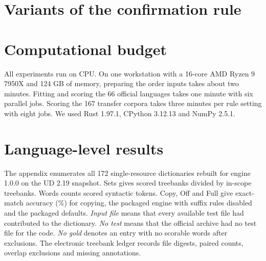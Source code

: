 \documentclass[11pt]{article}
\begin{document}
\section{Variants of the confirmation rule}
\label{app:gate}
\begin{table}[H]
\centering\small

\caption{The confirmation rule with other significance levels $\alpha$ and
with or without the minimum net gain on development data. Acc.\ counts
accepted languages among the 66 with official fits. $\Delta$ is the macro
change and Regr.\ the regressions, on the 66 anchor tests and on the new
corpora of \trOffLang{} languages. The third row is the rule used in the
paper.}
\label{tab:gate}
\end{table}

\section{Computational budget}
\label{app:compute}
All experiments run on CPU. On one workstation with a 16-core AMD Ryzen 9
7950X and 124 GB of memory, preparing the order inputs takes about two
minutes. Fitting and scoring the 66 official languages takes one minute with
six parallel jobs. Scoring the 167 transfer corpora takes three minutes per
rule setting with eight jobs. We used Rust 1.97.1, CPython 3.12.13 and
NumPy 2.5.1.

\section{Language-level results}
\label{app:catalog}
The appendix enumerates all 172 single-resource dictionaries rebuilt for engine 1.0.0 on the UD 2.19 snapshot. Sets gives
scored treebanks divided by in-scope treebanks. Words counts scored syntactic
tokens. Copy, Off and Full give exact-match accuracy (\%) for copying, the
packaged engine with suffix rules disabled and the packaged defaults.
\emph{Input file} means that every available test file had contributed to the
dictionary. \emph{No test} means that the official archive had no test file
for the code. \emph{No gold} denotes an entry with no scorable words after
exclusions. The electronic treebank ledger records file digests, paired
counts, overlap exclusions and missing annotations.


\end{document}
